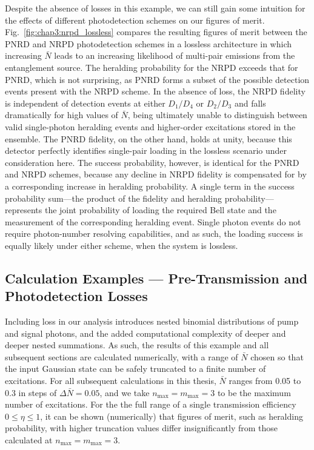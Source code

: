 \documentclass[aps,twocolumn,secnumarabic,amsmath,amssymb,pra,groupedaddress,
showpacs, showkeys,draft]{revtex4-1}
\begin{document}
Despite the absence of losses in this example, we can still gain some intuition
for the effects of different photodetection schemes on our figures of
merit. Fig.~\ref{fig:chap3:nrpd_lossless} compares the resulting figures of
merit between the PNRD and NRPD photodetection schemes in a lossless
architecture in which increasing $\bar{N}$ leads to an increasing likelihood of
multi-pair emissions from the entanglement source. The heralding probability
for the NRPD exceeds that for PNRD, which is not surprising, as PNRD forms a
subset of the possible detection events present with the NRPD scheme. In the
absence of loss, the NRPD fidelity is independent of detection events at either
$D_{1}/D_{4}$ or $D_{2}/D_{3}$ and falls dramatically for high values of
$\bar{N}$, being ultimately unable to distinguish between valid single-photon
heralding events and higher-order excitations stored in the ensemble. The PNRD
fidelity, on the other hand, holds at unity, because this detector perfectly
identifies single-pair loading in the lossless scenario under consideration
here. The success probability, however, is identical for the PNRD and NRPD
schemes, because any decline in NRPD fidelity is compensated for by a
corresponding increase in heralding probability. A single term in the success
probability sum---the product of the fidelity and heralding
probability---represents the joint probability of loading the required Bell
state and the measurement of the corresponding heralding event. Single photon
events do not require photon-number resolving capabilities, and as such, the
loading success is equally likely under either scheme, when the system is
lossless.

\subsection{Calculation Examples --- Pre-Transmission and Photodetection
  Losses\label{sec:example:two}}

Including loss in our analysis introduces nested binomial distributions of pump
and signal photons, and the added computational complexity of deeper and deeper
nested summations. As such, the results of this example and all subsequent
sections are calculated numerically, with a range of $\bar{N}$ chosen so that
the input Gaussian state can be safely truncated to a finite number of
excitations. For all subsequent calculations in this thesis, $\bar{N}$ ranges
from 0.05 to 0.3 in steps of $\Delta \bar{N}=0.05$, and we take
$n_{\textrm{max}}=m_{\textrm{max}}=3$ to be the maximum number of
excitations. For the the full range of a single transmission efficiency $ 0
\leq \eta \leq 1$, it can be shown (numerically) that figures of merit, such as
heralding probability, with higher truncation values differ insignificantly
from those calculated at $n_{\textrm{max}}=m_{\textrm{max}}=3$. 
\end{document}
